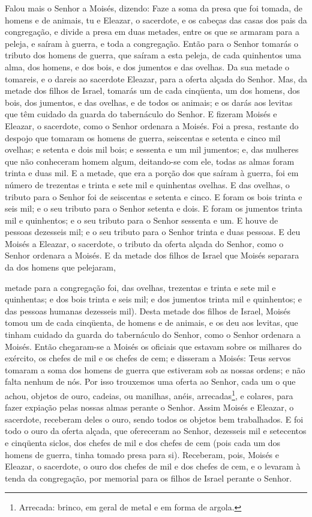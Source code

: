 Falou mais o Senhor a Moisés, dizendo: Faze a soma da
presa que foi tomada, de homens e de animais, tu e Eleazar, o
sacerdote, e os cabeças das casas dos pais da congregação, e
divide a presa em duas metades, entre os que se armaram para a
peleja, e saíram à guerra, e toda a congregação. Então para o
Senhor tomarás o tributo dos homens de guerra, que saíram a esta
peleja, de cada quinhentos uma alma, dos homens, e dos bois, e dos
jumentos e das ovelhas. Da sua metade o tomareis, e o dareis
ao sacerdote Eleazar, para a oferta alçada do Senhor. Mas, da
metade dos filhos de Israel, tomarás um de cada cinqüenta, um dos
homens, dos bois, dos jumentos, e das ovelhas, e de todos os
animais; e os darás aos levitas que têm cuidado da guarda do
tabernáculo do Senhor. E fizeram Moisés e Eleazar, o
sacerdote, como o Senhor ordenara a Moisés. Foi a presa,
restante do despojo que tomaram os homens de guerra, seiscentas e
setenta e cinco mil ovelhas; e setenta e dois mil bois;
e sessenta e um mil jumentos; e, das mulheres que não
conheceram homem algum, deitando-se com ele, todas as almas foram
trinta e duas mil. E a metade, que era a porção dos que
saíram à guerra, foi em número de trezentas e trinta e sete mil e
quinhentas ovelhas. E das ovelhas, o tributo para o Senhor
foi de seiscentas e setenta e cinco. E foram os bois trinta e
seis mil; e o seu tributo para o Senhor setenta e dois. E
foram os jumentos trinta mil e quinhentos; e o seu tributo para o
Senhor sessenta e um. E houve de pessoas dezesseis mil; e o
seu tributo para o Senhor trinta e duas pessoas. E deu Moisés
a Eleazar, o sacerdote, o tributo da oferta alçada do Senhor, como o
Senhor ordenara a Moisés. E da metade dos filhos de Israel
que Moisés separara da dos homens que pelejaram,

metade para a congregação foi, das ovelhas, trezentas e trinta
e sete mil e quinhentas; e dos bois trinta e seis mil;
e dos jumentos trinta mil e quinhentos; e das pessoas
humanas dezesseis mil). Desta metade dos filhos de Israel,
Moisés tomou um de cada cinqüenta, de homens e de animais, e os deu
aos levitas, que tinham cuidado da guarda do tabernáculo do Senhor,
como o Senhor ordenara a Moisés. Então chegaram-se a Moisés
os oficiais que estavam sobre os milhares do exército, os chefes de
mil e os chefes de cem; e disseram a Moisés: Teus servos
tomaram a soma dos homens de guerra que estiveram sob as nossas
ordens; e não falta nenhum de nós. Por isso trouxemos uma
oferta ao Senhor, cada um o que achou, objetos de ouro, cadeias, ou
manilhas, anéis, arrecadas\footnote{Arrecada: brinco, em geral de
metal e em forma de argola.}, e colares, para fazer expiação pelas
nossas almas perante o Senhor. Assim Moisés e Eleazar, o
sacerdote, receberam deles o ouro, sendo todos os objetos bem
trabalhados. E foi todo o ouro da oferta alçada, que
ofereceram ao Senhor, dezesseis mil e setecentos e cinqüenta siclos,
dos chefes de mil e dos chefes de cem (pois cada um dos
homens de guerra, tinha tomado presa para si). Receberam,
pois, Moisés e Eleazar, o sacerdote, o ouro dos chefes de mil e dos
chefes de cem, e o levaram à tenda da congregação, por memorial para
os filhos de Israel perante o Senhor.

